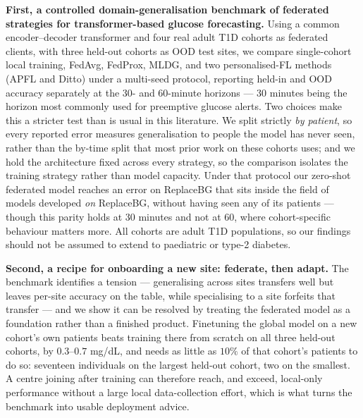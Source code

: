\documentclass[10pt,letterpaper]{article}
\begin{document}
\textbf{First, a controlled domain-generalisation benchmark of federated
strategies for transformer-based glucose forecasting.} Using a common
encoder--decoder transformer and four real adult T1D cohorts as federated
clients, with three held-out cohorts as OOD test sites, we compare single-cohort
local training, FedAvg, FedProx, MLDG, and two personalised-FL methods (APFL and
Ditto) under a multi-seed protocol, reporting held-in and OOD accuracy separately
at the 30- and 60-minute horizons --- 30 minutes being the horizon most commonly
used for preemptive glucose alerts. Two choices make this a stricter test than is
usual in this literature. We split strictly \emph{by patient}, so every reported
error measures generalisation to people the model has never seen, rather than the
by-time split that most prior work on these cohorts uses; and we hold the
architecture fixed across every strategy, so the comparison isolates the training
strategy rather than model capacity. Under that protocol our zero-shot federated
model reaches an error on ReplaceBG that sits inside the field of models developed
\emph{on} ReplaceBG, without having seen any of its patients --- though this parity
holds at 30 minutes and not at 60, where cohort-specific behaviour matters more.
All cohorts are adult T1D populations, so our findings should not be assumed to
extend to paediatric or type-2 diabetes.

\textbf{Second, a recipe for onboarding a new site: federate, then adapt.} The
benchmark identifies a tension --- generalising across sites transfers well but
leaves per-site accuracy on the table, while specialising to a site forfeits that
transfer --- and we show it can be resolved by treating the federated model as a
foundation rather than a finished product. Finetuning the global model on a new
cohort's own patients beats training there from scratch on all three held-out
cohorts, by $0.3$--$0.7$ mg/dL, and needs as little as $10\%$ of that cohort's
patients to do so: seventeen individuals on the largest held-out cohort, two on
the smallest. A centre joining after training can therefore reach, and exceed,
local-only performance without a large local data-collection effort, which is what
turns the benchmark into usable deployment advice.
\end{document}
